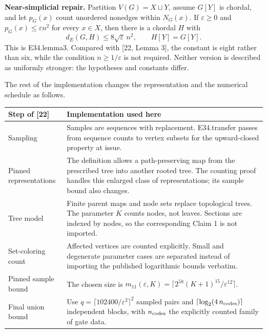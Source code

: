 \documentclass[english,11pt,a4paper]{article}
\newcounter{none}
\begin{document}
\textbf{Near-simplicial repair.} Partition \(V(G)=X\sqcup Y\), assume \(G[Y]\) is chordal, and let \(p_G(x)\) count unordered nonedges within \(N_G(x)\). If \(\varepsilon\ge0\) and \(p_G(x)\le\varepsilon n^2\) for every \(x\in X\), then there is a chordal \(H\) with \[
d_E(G,H)\le8\sqrt{\varepsilon}\,n^2,\qquad H[Y]=G[Y].
\tag{F.10}
\] This is {\ttfamily\small E34.\discretionary{\hbox{\ensuremath{\hookrightarrow}}}{}{}lemma3}. Compared with {[}22, Lemma 3{]}, the constant is eight rather than six, while the condition \(n\ge1/\varepsilon\) is not required. Neither version is described as uniformly stronger: the hypotheses and constants differ.

The rest of the implementation changes the representation and the numerical schedule as follows.


{\def\LTcaptype{none} %
\begin{longtable}[c]{@{}
  >{\raggedright\arraybackslash}p{}
  >{\raggedright\arraybackslash}p{}@{}}
\toprule\noalign{}
\begin{minipage}[b]{\linewidth}\raggedright
Step of {[}22{]}
\end{minipage} & \begin{minipage}[b]{\linewidth}\raggedright
Implementation used here
\end{minipage} \\
\midrule\noalign{}
\endhead
\bottomrule\noalign{}
\endlastfoot
Sampling & Samples are sequences with replacement. {\ttfamily\small E34.\discretionary{\hbox{\ensuremath{\hookrightarrow}}}{}{}transfer} passes from sequence counts to vertex subsets for the upward-closed property at issue. \\
Pinned representations & The definition allows a path-preserving map from the prescribed tree into another rooted tree. The counting proof handles this enlarged class of representations; its sample bound also changes. \\
Tree model & Finite parent maps and node sets replace topological trees. The parameter \(K\) counts nodes, not leaves. Sections are indexed by nodes, so the corresponding Claim 1 is not imported. \\
Set-coloring count & Affected vertices are counted explicitly. Small and degenerate parameter cases are separated instead of importing the published logarithmic bounds verbatim. \\
Pinned sample bound & The chosen size is \(m_{11}(\varepsilon,K)=\lceil2^{58}(K+1)^{15}/\varepsilon^{12}\rceil\). \\
Final union bound & Use \(q=\lceil102400/\varepsilon^2\rceil^2\) sampled pairs and \(\lceil\log_2(4\,n_{\rm codes})\rceil\) independent blocks, with \(n_{\rm codes}\) the explicitly counted family of gate data. \\
\end{longtable}
}
\end{document}
